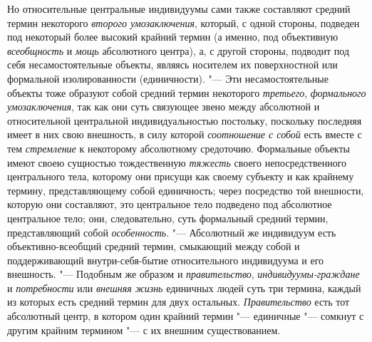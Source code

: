 {{Но относительные центральные индивидуумы сами также составляют
средний термин некоторого {\em второго
умозаключения}, который, с одной стороны, подведен под
некоторый более высокий крайний термин (а именно, под объективную
{\em всеобщность} и
{\em мощь} абсолютного
центра), а, с другой стороны, подводит под себя несамостоятельные объекты,
являясь носителем их поверхностной или формальной изолированности
(единичности).
"--- Эти несамостоятельные объекты тоже образуют
собой средний термин некоторого
{\em третьего},
{\em формального умозаключения},
так как они суть связующее звено между абсолютной и
относительной центральной индивидуальностью постольку, поскольку последняя
имеет в них свою внешность, в силу которой
{\em соотношение с собой}
есть вместе с тем
{\em стремление} к
некоторому абсолютному средоточию. Формальные объекты имеют своею сущностью
тождественную {\em тяжесть}
своего непосредственного центрального тела, которому они
присущи как своему субъекту и как крайнему термину, представляющему собой
единичность; через посредство той внешности, которую они составляют, это
центральное тело подведено под абсолютное центральное тело; они,
следовательно, суть формальный средний термин, представляющий собой
{\em особенность}.
"--- Абсолютный же индивидуум есть объективно-всеобщий средний
термин, смыкающий между собой и поддерживающий внутри-себя-бытие
относительного индивидуума и его
внешность.
"--- \label{bkm:bm52b}Подобным же образом и
{\em правительство},
{\em индивидуумы-граждане
}и {\em потребности}
или {\em внешняя жизнь}
единичных людей суть три термина, каждый из которых есть
средний термин для двух остальных.
{\em Правительство} есть
тот абсолютный центр, в котором один крайний термин
"--- единичные "--- сомкнут с другим крайним
термином "--- с их внешним
существованием.
}}
